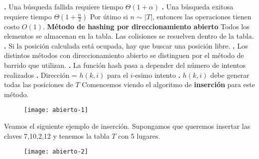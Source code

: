 \documentclass[10pt,a4paper]{article}
\begin{document}
\newline
\textbf{.} Una búsqueda fallida requiere tiempo $\Theta(1+\alpha)$
\newline
\newline
\textbf{.} Una búsqueda exitosa requiere tiempo $\Theta(1+\displaystyle \frac{\alpha}{2})$
\newline
\newline
Por útimo si $n$ $\sim$ $|$$T$$|$, entonces las operaciones tienen costo $O(1)$.
\newline
\newline
\textbf{Método de hashing por direccionamiento abierto}
\newline
\newline
Todos los elementos se almacenan en la tabla.
\newline
\newline
Las colisiones se resuelven dentro de la tabla.
\newline
\newline
\textbf{.} Si la posición calculada está ocupada, hay que buscar una posición libre.
\newline
\newline
\textbf{.} Los distintos métodos con direccionamiento abierto se distinguen por el método de barrido que utilizan.
\newline
\newline
\textbf{.} La función hash pasa a depender del número de intentos realizados
\newline
\newline
\textbf{.} Dirección = $h(k,i)$ para el $i$-esimo intento
\newline
\newline
\textbf{.} $h(k,i)$ debe generar todas las posiciones de $T$
\newline
\newline
Comencemos viendo el algoritmo de \textbf{inserción} para este método.
\newline
\begin{figure}[h]
	\centering
\texttt{[image: abierto-1]}
	\label{drivers1}
\end{figure}
\newpage
Veamos el siguiente ejemplo de inserción.
\newline
\newline
Supongamos que queremos insertar las claves 7,10,2,12 y tenemos la tabla $T$ con 5 lugares.
\newline
\begin{figure}[h]
	\centering
\texttt{[image: abierto-2]}
	\label{drivers1}
\end{figure}
\end{document}
